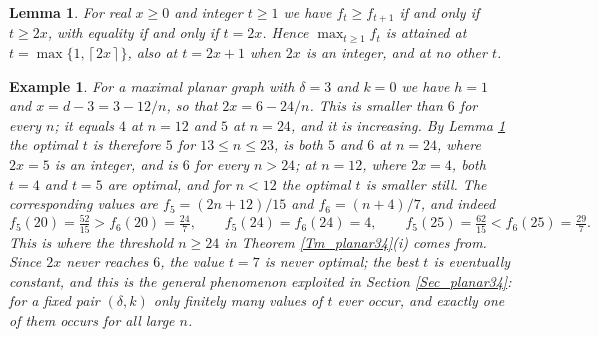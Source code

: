 \documentclass[12pt,a4paper]{article}%
\newtheorem{example}[theorem]{Example}
\newtheorem{lemma}[theorem]{Lemma}
\begin{document}



\begin{lemma}
\label{Lemma_bestt}For real $x\geq 0$ and integer $t\geq 1$ we have $f_{t}\geq f_{t+1}$ if and only
if $t\geq 2x$, with equality if and only if $t=2x$. Hence $\max_{t\geq 1}f_{t}$ is attained at
$t=\max \{1,\left\lceil 2x\right\rceil \}$, also at $t=2x+1$ when $2x$ is an integer, and at no
other $t$.
\end{lemma}

\begin{example}
\label{Ex_bestt}For a maximal planar graph with $\delta =3$ and $k=0$ we have
$h=1$ and $x=d-3=3-12/n$, so that $2x=6-24/n$. This is smaller than $6$ for
every $n$; it equals $4$ at $n=12$ and $5$ at $n=24$, and it is increasing. By
Lemma \ref{Lemma_bestt} the optimal $t$ is therefore $5$ for $13\leq n\leq 23$,
is both $5$ and $6$ at $n=24$, where $2x=5$ is an integer, and is $6$ for every
$n>24$; at $n=12$, where $2x=4$, both $t=4$ and $t=5$ are optimal, and for
$n<12$ the optimal $t$ is smaller still. The corresponding values are
$f_{5}=(2n+12)/15$ and $f_{6}=(n+4)/7$, and indeed
\[
f_{5}(20)=\tfrac{52}{15}>f_{6}(20)=\tfrac{24}{7},\qquad f_{5}(24)=f_{6}%
(24)=4,\qquad f_{5}(25)=\tfrac{62}{15}<f_{6}(25)=\tfrac{29}{7}.
\]
This is where the threshold $n\geq 24$ in Theorem \ref{Tm_planar34}(i) comes
from. Since $2x$ never reaches $6$, the value $t=7$ is never optimal; the best
$t$ is eventually constant, and this is the general phenomenon exploited in
Section \ref{Sec_planar34}: for a fixed pair $(\delta ,k)$ only finitely many
values of $t$ ever occur, and exactly one of them occurs for all large $n$.
\end{example}
\end{document}
